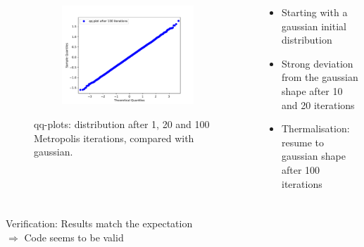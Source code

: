 \documentclass[aspectratio=169]{beamer}
\begin{document}
\begin{frame}
\begin{columns}
\begin{column}{0.6\textwidth}
\begin{figure}[H]
\begin{subfigure}[c]{0.49\textwidth}
				\end{subfigure}
				\begin{subfigure}[c]{0.49\textwidth}
					\includegraphics[width=\textwidth]{../imgs/harmonic_oscillator_track/track_10010000_qq_100.pdf}
				\end{subfigure}
				\caption{qq-plots: distribution after 1, 20 and 100 Metropolis iterations, compared with gaussian.}
				\label{fig:harmonic_oscillator_track_track_10010000_qqs}
			\end{figure}
		\end{column}
		\begin{column}{0.39\textwidth}
			\begin{itemize}
				\item Starting with a gaussian initial distribution
				\item Strong deviation from the gaussian shape after 10 and 20 iterations
				\item Thermalisation: resume to gaussian shape after 100 iterations
			\end{itemize}
		\end{column}
	\end{columns}
\end{frame}


\begin{frame}
\frametitle{}
\begin{center}
	Verification: Results match the expectation
	\\
	$\Rightarrow$ Code seems to be valid
\end{center}
\end{frame}
\end{document}
